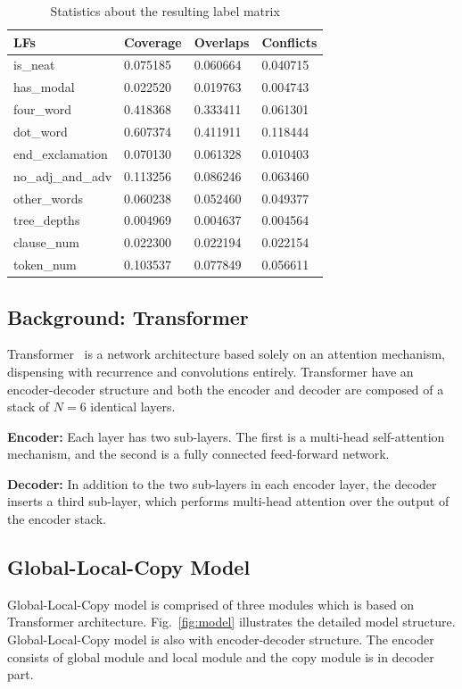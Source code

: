 \documentclass[sigconf]{acmart}
\begin{document}
\begin{table}
  \caption{Statistics about the resulting label matrix}
  \label{table:LabelMatrix}
  \begin{tabular}{p{2cm}p{1.5cm}p{1.5cm}p{1.5cm}}
    \toprule
    LFs & Coverage & Overlaps & Conflicts\\
    \midrule
    is\_neat & 0.075185 & 0.060664 & 0.040715\\
    has\_modal & 0.022520 & 0.019763 & 0.004743\\
    four\_word & 0.418368 & 0.333411 & 0.061301 \\
    dot\_word & 0.607374 & 0.411911 & 0.118444\\
    end\_exclamation & 0.070130 & 0.061328 & 0.010403\\
    no\_adj\_and\_adv & 0.113256 & 0.086246 & 0.063460\\
    other\_words & 0.060238 & 0.052460 & 0.049377\\
    tree\_depths & 0.004969 & 0.004637 & 0.004564\\
    clause\_num & 0.022300 & 0.022194 & 0.022154\\
    token\_num & 0.103537 & 0.077849 & 0.056611\\
  \bottomrule
\end{tabular}
\end{table}

\subsection{Background: Transformer}
Transformer~\cite{vaswani2017attention} is a network architecture based solely on an attention mechanism, dispensing with recurrence and convolutions entirely. Transformer have an encoder-decoder structure and both the encoder and decoder are composed of a stack of $N = 6$ identical layers.

\textbf{Encoder:} Each layer has two sub-layers. The first is a multi-head self-attention mechanism, and the second is a fully connected feed-forward network.

\textbf{Decoder:} In addition to the two sub-layers in each encoder layer, the decoder inserts a third sub-layer, which performs multi-head attention over the output of the encoder stack. 


\subsection{Global-Local-Copy Model}
Global-Local-Copy model is comprised of three modules which is based on Transformer architecture. Fig.~\ref{fig:model} illustrates the detailed model structure. Global-Local-Copy model is also with encoder-decoder structure. The encoder consists of global module and local module and the copy module is in decoder part. 
\end{document}
